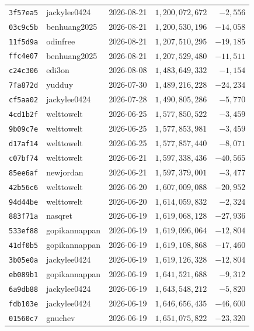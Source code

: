 {\begin{longtable}{@{}lllrr@{}}
\texttt{3f57ea5} & jackylee0424 & 2026-08-21 & $1{,}200{,}072{,}672$ & $-2{,}556$\\
\texttt{03c9c5b} & benhuang2025 & 2026-08-21 & $1{,}200{,}530{,}196$ & $-14{,}058$\\
\texttt{11f5d9a} & odinfree & 2026-08-21 & $1{,}207{,}510{,}295$ & $-19{,}185$\\
\texttt{ffc4e07} & benhuang2025 & 2026-08-21 & $1{,}207{,}529{,}480$ & $-11{,}511$\\
\texttt{c24c306} & edi3on & 2026-08-08 & $1{,}483{,}649{,}332$ & $-1{,}154$\\
\texttt{7fa872d} & yudduy & 2026-07-30 & $1{,}489{,}216{,}228$ & $-24{,}234$\\
\texttt{cf5aa02} & jackylee0424 & 2026-07-28 & $1{,}490{,}805{,}286$ & $-5{,}770$\\
\texttt{4cd1b2f} & welttowelt & 2026-06-25 & $1{,}577{,}850{,}522$ & $-3{,}459$\\
\texttt{9b09c7e} & welttowelt & 2026-06-25 & $1{,}577{,}853{,}981$ & $-3{,}459$\\
\texttt{d17af14} & welttowelt & 2026-06-25 & $1{,}577{,}857{,}440$ & $-8{,}071$\\
\texttt{c07bf74} & welttowelt & 2026-06-21 & $1{,}597{,}338{,}436$ & $-40{,}565$\\
\texttt{85ee6af} & newjordan & 2026-06-21 & $1{,}597{,}379{,}001$ & $-3{,}477$\\
\texttt{42b56c6} & welttowelt & 2026-06-20 & $1{,}607{,}009{,}088$ & $-20{,}952$\\
\texttt{94d44be} & welttowelt & 2026-06-20 & $1{,}614{,}059{,}832$ & $-2{,}324$\\
\texttt{883f71a} & nasqret & 2026-06-19 & $1{,}619{,}068{,}128$ & $-27{,}936$\\
\texttt{533ef88} & gopikannappan & 2026-06-19 & $1{,}619{,}096{,}064$ & $-12{,}804$\\
\texttt{41df0b5} & gopikannappan & 2026-06-19 & $1{,}619{,}108{,}868$ & $-17{,}460$\\
\texttt{3b05e0a} & jackylee0424 & 2026-06-19 & $1{,}619{,}126{,}328$ & $-12{,}804$\\
\texttt{eb089b1} & gopikannappan & 2026-06-19 & $1{,}641{,}521{,}688$ & $-9{,}312$\\
\texttt{6a9db88} & jackylee0424 & 2026-06-19 & $1{,}643{,}548{,}212$ & $-5{,}820$\\
\texttt{fdb103e} & jackylee0424 & 2026-06-19 & $1{,}646{,}656{,}435$ & $-46{,}600$\\
\texttt{01560c7} & gnuchev & 2026-06-19 & $1{,}651{,}075{,}822$ & $-23{,}320$\\

\end{longtable}}
